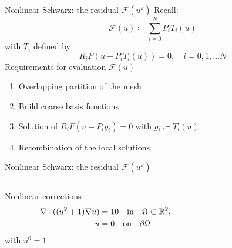 \begin{frame}{Nonlinear Schwarz: the residual $\mathcal{F}(u^k)$}
    Recall:
    \begin{equation*}
        \mathcal{F}(u) \coloneqq \sum_{i=0}^NP_iT_i(u)
    \end{equation*}
    with $T_i$ defined by 
    \begin{equation*}
        R_iF(u-P_iT_i(u)) = 0, \quad i = 0,1,\dots N
    \end{equation*}
    Requirements for evaluation $\mathcal{F}(u)$
    \begin{enumerate}
        \item Overlapping partition of the mesh
        \item Build coarse basis functions
        \item Solution of $R_iF(u-P_ig_i) = 0$ with $g_i\coloneqq T_i(u)$
        \item Recombination of the local solutions
    \end{enumerate}
\end{frame}



\begin{frame}{Nonlinear Schwarz: the residual $\mathcal{F}(u^k)$}
    \begin{columns}
        \begin{column}{0.5\textwidth}
            \vfill
            \hspace*{10pt}
            Nonlinear corrections 
            \hspace*{20pt}
            \begin{align*}
                \hspace*{6pt}-\nabla\cdot((u^2+1)\nabla u)&=10\quad \text{in}\quad \Omega\subset\mathbb{R}^2,\\
                        u &= 0\quad\text{on}\quad\partial\Omega
            \end{align*}
            \hspace*{10pt}with $u^0 = 1$
        \end{column}
        \begin{column}{0.5\textwidth}
            \begin{figure}
                \centering
                
            \end{figure}   
        \end{column}
    \end{columns}
    
    
\end{frame}

